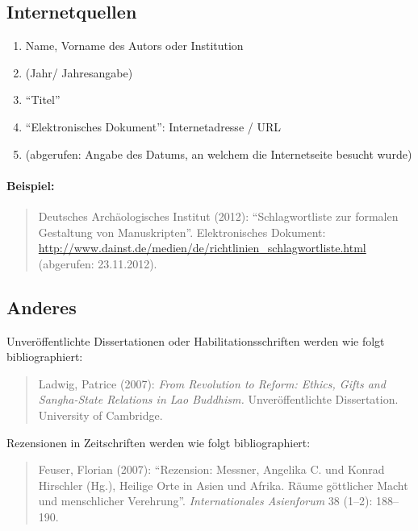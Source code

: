 \documentclass[ 12pt,
                titlepage,
                parskip=half,
                version=first,
                bibliography=totocnumbered,
                final,
                listof=totoc]{scrartcl}
\begin{document}
\subsection{Internetquellen}
\label{sec:sub_internetquellen}

\begin{enumerate}
    \item Name, Vorname des Autors oder Institution
    \item (Jahr/ Jahresangabe)
    \item \enquote{Titel}
    \item \enquote{Elektronisches Dokument}: Internetadresse / URL
    \item (abgerufen: Angabe des Datums, an welchem die Internetseite besucht
    wurde)
\end{enumerate}

\paragraph{Beispiel:}
\begin{quote}
Deutsches Archäologisches Institut (2012): \enquote{Schlagwortliste zur formalen
Gestaltung von Manuskripten}. Elektronisches Dokument:
\url{http://www.dainst.de/medien/de/richtlinien_schlagwortliste.html}
(abgerufen: 23.11.2012).
\end{quote}

\subsection{Anderes}
\label{sec:Anderes}

Unveröffentlichte Dissertationen oder Habilitationsschriften werden wie folgt
bibliographiert:

\begin{quote}
Ladwig, Patrice (2007): \emph{From Revolution to Reform: Ethics, Gifts and
Sangha-State Relations in Lao Buddhism.} Unveröffentlichte Dissertation.
University of Cambridge.
\end{quote}

Rezensionen in Zeitschriften werden wie folgt bibliographiert:

\begin{quote}
Feuser, Florian (2007): \enquote{Rezension: Messner, Angelika C.
und Konrad Hirschler (Hg.), Heilige Orte in Asien und Afrika. Räume göttlicher
Macht und menschlicher Verehrung}. \emph{Internationales Asienforum} 38 (1--2):
188--190.
\end{quote}
\end{document}
